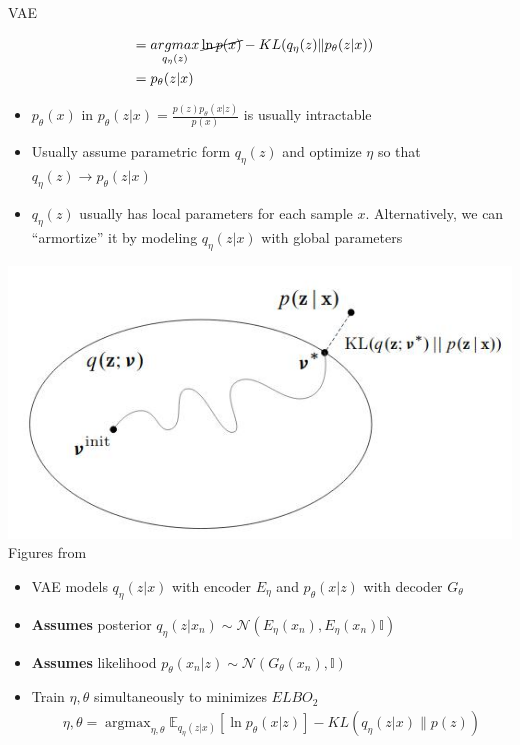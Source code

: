 \documentclass[compress]{beamer}
\newcommand{\expects}[2]{\mathbb{E}_{#1} \left[ #2 \right]}
\begin{document}
\begin{frame}[allowframebreaks]{VAE}
\begin{itemize}
\begin{itemize}
\begin{align*}
                                    &  =  \mathop{argmax}_{q_\eta(z)} \cancel{\ln p(x)} - KL(q_{\eta}(z)\|p_{\theta}(z|x)) & \\ 
                                    & = p_{\theta}(z|x) & \\
                    \end{align*}
            \end{itemize}
    \end{itemize}
    \framebreak
    \begin{itemize}
        \item $p_{\theta}(x)$ in $p_{\theta}(z|x)= \frac{p(z)p_{\theta}(x|z)}{p(x)} $ is usually intractable
        \item Usually assume parametric form $q_{\eta}(z)$ and optimize $\eta$ so that $q_{\eta}(z)\rightarrow p_\theta(z|x)$
        \item $q_\eta(z)$ usually has local parameters for each sample $x$. Alternatively, we can ``armortize'' it by modeling $q_\eta(z|x)$ with global parameters
    \end{itemize}
    \includegraphics[scale=0.5]{vae}
    {
        \tiny{Figures from \cite{blei2016variational}}
    }
    \framebreak

    \begin{itemize}
        \item VAE models $q_{\eta}(z|x)$ with encoder $E_{\eta}$ and $p_{\theta}(x|z)$  with decoder $G_{\theta}$ 
        \item \textbf{Assumes} posterior $q_{\eta}(z|x_n) \sim \mathcal{N}(E_{\eta}(x_n), E_{\eta}(x_n) \mathbb{I})$
        \item \textbf{Assumes} likelihood $p_{\theta}(x_n|z) \sim \mathcal{N}(G_{\theta}(x_n), \mathbb{I})$
        \item Train $\eta, \theta$ simultaneously to minimizes $ELBO_2$
            \begin{align*}
                \eta, \theta = \mathop{argmax}_{\eta, \theta} \expects{q_{\eta}(z|x)}{\ln p_{\theta}(x|z)} - KL(q_{\eta}(z|x)\|p(z))
            \end{align*}
                

\end{itemize}
\end{frame}
\end{document}
